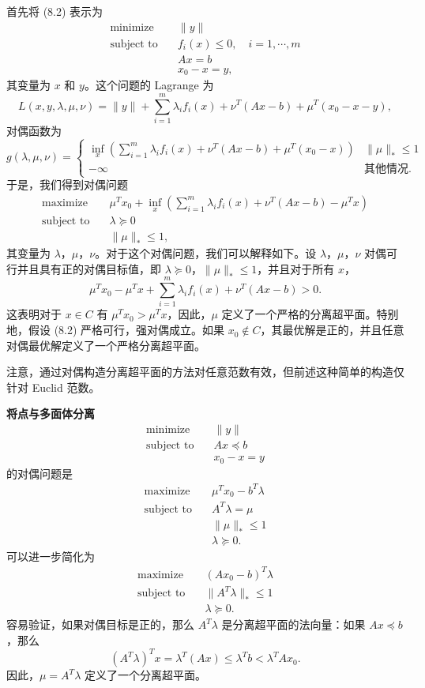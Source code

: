 \documentclass[UTF8, 12pt, fontset=fandol, oneside]{ctexart}
\begin{document}
首先将 (8.2) 表示为
\[
\begin{aligned}
\text{minimize}\quad & \|y\|\\
\text{subject to}\quad & f_i(x)\leq 0,\quad i=1,\cdots,m\\
& Ax=b\\
& x_0-x=y,
\end{aligned}
\]
其变量为 $x$ 和 $y$。这个问题的 Lagrange 为
\[
L(x,y,\lambda,\mu,\nu)=\|y\|+\sum_{i=1}^m\lambda_i f_i(x)+\nu^T(Ax-b)+\mu^T(x_0-x-y),
\]
对偶函数为
\[
g(\lambda,\mu,\nu)=
\begin{cases}
\displaystyle\inf_x\left(\sum_{i=1}^m\lambda_i f_i(x)+\nu^T(Ax-b)+\mu^T(x_0-x)\right) & \|\mu\|_\ast\leq 1\\
-\infty & \text{其他情况}.
\end{cases}
\]
于是，我们得到对偶问题
\[
\begin{aligned}
\text{maximize}\quad & \mu^T x_0+\inf_x\left(\sum_{i=1}^m\lambda_i f_i(x)+\nu^T(Ax-b)-\mu^T x\right)\\
\text{subject to}\quad & \lambda\succeq 0\\
& \|\mu\|_\ast\leq 1,
\end{aligned}
\]
其变量为 $\lambda$，$\mu$，$\nu$。对于这个对偶问题，我们可以解释如下。设 $\lambda$，$\mu$，$\nu$ 对偶可行并且具有正的对偶目标值，即 $\lambda\succeq 0$，$\|\mu\|_\ast\leq 1$，并且对于所有 $x$，
\[
\mu^T x_0-\mu^T x+\sum_{i=1}^m\lambda_i f_i(x)+\nu^T(Ax-b)>0.
\]
这表明对于 $x\in C$ 有 $\mu^Tx_0>\mu^Tx$，因此，$\mu$ 定义了一个严格的分离超平面。特别地，假设 (8.2) 严格可行，强对偶成立。如果 $x_0\notin C$，其最优解是正的，并且任意对偶最优解定义了一个严格分离超平面。

注意，通过对偶构造分离超平面的方法对任意范数有效，但前述这种简单的构造仅针对 Euclid 范数。

\noindent\textbf{将点与多面体分离}\quad
\[
\begin{aligned}
\text{minimize}\quad & \|y\|\\
\text{subject to}\quad & Ax\preceq b\\
& x_0-x=y
\end{aligned}
\]
的对偶问题是
\[
\begin{aligned}
\text{maximize}\quad & \mu^T x_0-b^T\lambda\\
\text{subject to}\quad & A^T\lambda=\mu\\
& \|\mu\|_\ast\leq 1\\
& \lambda\succeq 0.
\end{aligned}
\]
可以进一步简化为
\[
\begin{aligned}
\text{maximize}\quad & (Ax_0-b)^T\lambda\\
\text{subject to}\quad & \|A^T\lambda\|_\ast\leq 1\\
& \lambda\succeq 0.
\end{aligned}
\]
容易验证，如果对偶目标是正的，那么 $A^T\lambda$ 是分离超平面的法向量：如果 $Ax\preceq b$，那么
\[
(A^T\lambda)^Tx=\lambda^T(Ax)\leq \lambda^Tb<\lambda^TAx_0.
\]
因此，$\mu=A^T\lambda$ 定义了一个分离超平面。
\end{document}

